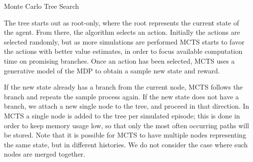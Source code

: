 \begin{algorithm}
\begin{multicols}{2}
    \caption{Monte Carlo Tree Search}


    \setcounter{AlgoLine}{0}

    \setcounter{AlgoLine}{0}

\end{multicols}
\end{algorithm}

The tree starts out as root-only, where the root represents the current state of the agent. From
there, the algorithm selects an action. Initially the actions are selected randomly, but as more
simulations are performed MCTS starts to favor the actions with better value estimates, in order to
focus available computation time on promising branches. Once an action has been selected, MCTS uses
a generative model of the MDP to obtain a sample new state and reward.

If the new state already has a branch from the current node, MCTS follows the branch and repeats the
sample process again. If the new state does not have a branch, we attach a new single node to the
tree, and proceed in that direction. In MCTS a single node is added to the tree per simulated
episode; this is done in order to keep memory usage low, so that only the most often occurring paths will
be stored. Note that it is possible for MCTS to have multiple nodes representing the same state, but
in different histories. We do not consider the case where such nodes are merged together.

